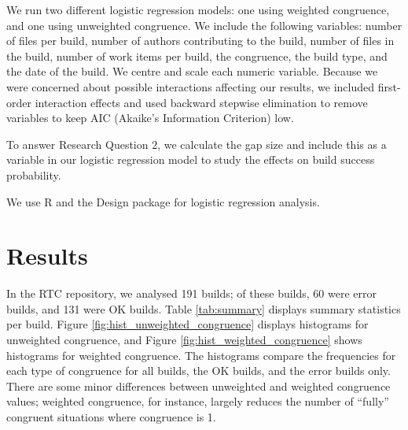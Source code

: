 We run two different logistic regression models: one using weighted congruence, and one using unweighted congruence. We include the following variables: number of files per build, number of authors contributing to the build, number of files in the build, number of work items per build, the congruence, the build type, and the date of the build. We centre and scale each numeric variable.
Because we were concerned about possible interactions affecting our results, we included first-order interaction effects and used backward stepwise elimination to remove variables to keep AIC (Akaike's Information Criterion) low.



To answer Research Question 2, we calculate the gap size and include this as a variable in our logistic regression model to study the effects on build success probability.


We use R \cite{R} and the Design package \cite{designR} for logistic regression analysis.



\section{Results}
\label{sec:results}

In the RTC repository, we analysed 191 builds; of these builds, 60 were error builds, and 131 were OK builds. Table \ref{tab:summary} displays summary statistics per build.
Figure \ref{fig:hist_unweighted_congruence} displays histograms for unweighted congruence, and Figure \ref{fig:hist_weighted_congruence} shows histograms for weighted congruence. The histograms compare the frequencies for each type of congruence for all builds, the OK builds, and the error builds only. There are some minor differences between unweighted and weighted congruence values; weighted congruence, for instance, largely reduces the number of ``fully'' congruent situations where congruence is 1.



